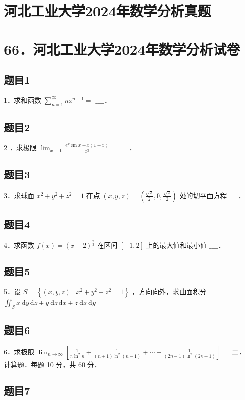 \documentclass{article}
\begin{document}
\section*{河北工业大学2024年数学分析真题}
\section*{66．河北工业大学2024年数学分析试卷}

\subsection{题目1}
1．求和函数 \(\sum_{n=1}^{\infty} n x^{n-1}=\) \(\_\_\_\_\)．

\subsection{题目2}
2 ．求极限 \(\lim _{x \rightarrow 0} \frac{e^{x} \sin x-x(1+x)}{x^{3}}=\) \(\_\_\_\_\)．

\subsection{题目3}
3．求球面 \(x^{2}+y^{2}+z^{2}=1\) 在点 \((x, y, z)=\left(\frac{\sqrt{2}}{2}, 0, \frac{\sqrt{2}}{2}\right)\) 处的切平面方程 \(\_\_\_\_\)．

\subsection{题目4}
4．求函数 \(f(x)=(x-2)^{\frac{2}{3}}\) 在区间 \([-1,2]\) 上的最大值和最小值 \(\_\_\_\_\)．

\subsection{题目5}
5．设 \(S=\left\{(x, y, z) \mid x^{2}+y^{2}+z^{2}=1\right\}\) ，方向向外，求曲面积分 \(\iint_{S} x \mathrm{~d} y \mathrm{~d} z+y \mathrm{~d} z \mathrm{~d} x+z \mathrm{~d} x \mathrm{~d} y=\)

\subsection{题目6}
6．求极限 \(\lim _{n \rightarrow \infty}\left[\frac{1}{n \ln ^{2} n}+\frac{1}{(n+1) \ln ^{2}(n+1)}+\cdots+\frac{1}{(2 n-1) \ln ^{2}(2 n-1)}\right]=\) 二．计算题．每题 10 分，共 60 分．

\begin{itemize}

\subsection{题目7}
\end{itemize}
\end{document}
